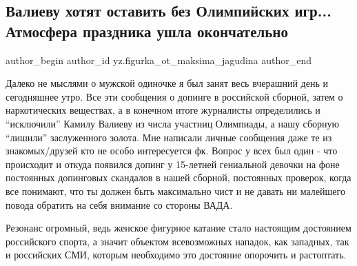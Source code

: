  
 
 
 
 
 
\subsection{Валиеву хотят оставить без Олимпийских игр... Атмосфера праздника ушла окончательно}
\label{sec:10_02_2022.yz.figurka_ot_maksima_jagudina.1.valieva}
 
\ifcmt
 author_begin
   author_id yz.figurka_ot_maksima_jagudina
 author_end
\fi

Далеко не мыслями о мужской одиночке я был занят весь вчерашний день и
сегодняшнее утро. Все эти сообщения о допинге в российской сборной, затем о
наркотических веществах, а в конечном итоге журналисты определились и
\enquote{исключили} Камилу Валиеву из числа участниц Олимпиады, а нашу сборную \enquote{лишили}
заслуженного золота. Мне написали личные сообщения даже те из знакомых/друзей
кто не особо интересуется фк. Вопрос у всех был один - что происходит и откуда
появился допинг у 15-летней гениальной девочки на фоне постоянных допинговых
скандалов в нашей сборной, постоянных проверок, когда все понимают, что ты
должен быть максимально чист и не давать ни малейшего повода обратить на себя
внимание со стороны ВАДА.


Резонанс огромный, ведь женское фигурное катание стало настоящим достоянием
российского спорта, а значит объектом всевозможных нападок, как западных, так и
российских СМИ, которым необходимо это достояние опорочить и растоптать.

